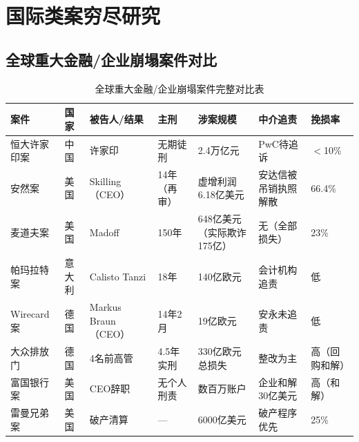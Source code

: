 \documentclass[11pt,a4paper,oneside,openany]{article}
\begin{document}
\section{国际类案穷尽研究}
\subsection{全球重大金融/企业崩塌案件对比}
\begin{longtable}{p{2cm}p{1.3cm}p{2.5cm}p{1.8cm}p{2.5cm}p{2cm}p{1.5cm}}
\caption{全球重大金融/企业崩塌案件完整对比表}\label{tab:international}\\
\toprule
\textbf{案件} & \textbf{国家} & \textbf{被告人/结果} & \textbf{主刑} & \textbf{涉案规模} & \textbf{中介追责} & \textbf{挽损率} \\
\midrule
恒大许家印案 & 中国 & 许家印 & 无期徒刑 & 2.4万亿元 & PwC待追诉 & $<$10\% \\
安然案 & 美国 & Skilling（CEO） & 14年（再审） & 虚增利润6.18亿美元 & 安达信被吊销执照解散 & 66.4\% \\
麦道夫案 & 美国 & Madoff & 150年 & 648亿美元（实际欺诈175亿） & 无（全部损失） & 23\% \\
帕玛拉特案 & 意大利 & Calisto Tanzi & 18年 & 140亿欧元 & 会计机构追责 & 低 \\
Wirecard案 & 德国 & Markus Braun（CEO） & 14年2月 & 19亿欧元 & 安永未追责 & 低 \\
大众排放门 & 德国 & 4名前高管 & 4.5年实刑 & 330亿欧元总损失 & 整改为主 & 高（回购和解） \\
富国银行案 & 美国 & CEO辞职 & 无个人刑责 & 数百万账户 & 企业和解30亿美元 & 高（和解） \\
雷曼兄弟案 & 美国 & 破产清算 & — & 6000亿美元 & 破产程序优先 & 25\% \\
\bottomrule
\end{longtable}
\end{document}
